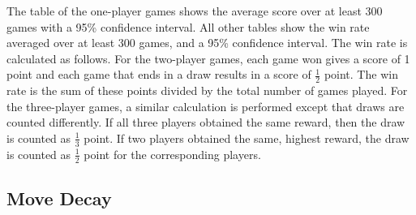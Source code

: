 \documentclass[journal]{IEEEtran}
\begin{document}
The table of the one-player games shows the average score over at least 300 games with a 95\% confidence interval.
All other tables show the win rate averaged over at least 300 games, and a 95\% confidence interval. %
The win rate is calculated as follows. For the two-player games, each game won gives a score of 1 point and each game that ends in a draw results in a score of $\frac{1}{2}$ point. The win rate is the sum of these points divided by the total number of games played. For the three-player games, a similar calculation is performed except that draws are counted differently. If all three players obtained the same reward, then the draw is counted as $\frac{1}{3}$ point. If two players obtained the same, highest reward, the draw is counted as $\frac{1}{2}$ point for the corresponding players.


\subsection{Move Decay}
\end{document}
